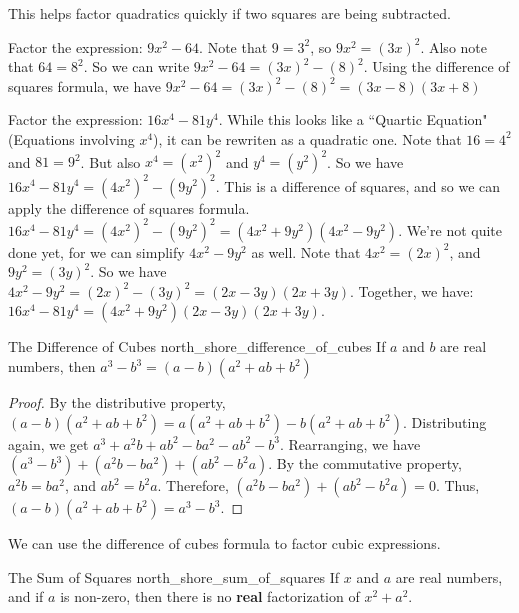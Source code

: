 \documentclass[crop=false,class=book,oneside]{standalone}
\begin{document}
        \begin{remark}
            This helps factor quadratics quickly if two
            squares are being subtracted.
        \end{remark}
        \begin{fexample}{}{}
            Factor the expression: $9x^{2}-64$.
            Note that $9=3^{2}$, so $9x^{2}=(3x)^{2}$.
            Also note that $64=8^{2}$. So we can write
            $9x^{2}-64=(3x)^{2}-(8)^{2}$.
            Using the difference of squares formula,
            we have $9x^{2}-64=(3x)^{2}-(8)^{2}=(3x-8)(3x+8)$
        \end{fexample}
        \begin{fexample}{}{}
        Factor the expression: $16x^{4}-81y^{4}$. While this looks like a ``Quartic Equation" (Equations involving $x^4$), it can be rewriten as a quadratic one. Note that $16=4^{2}$ and $81=9^{2}$. But also $x^{4}=(x^{2})^{2}$ and $y^{4}=(y^{2})^{2}$. So we have $16x^{4}-81y^{4}=(4x^{2})^{2}-(9y^{2})^{2}$. This is a difference of squares, and so we can apply the difference of squares formula. $16x^{4}-81y^{4}=(4x^{2})^{2}-(9y^{2})^{2}=(4x^{2}+9y^{2})(4x^{2}-9y^{2})$. We're not quite done yet, for we can simplify $4x^{2}-9y^{2}$ as well. Note that $4x^{2}=(2x)^{2}$, and $9y^{2}=(3y)^{2}$. So we have $4x^{2}-9y^{2}=(2x)^{2}-(3y)^{2}=(2x-3y)(2x+3y)$. Together, we have: $16x^{4}-81y^{4}=(4x^{2}+9y^{2})(2x-3y)(2x+3y)$.
        \end{fexample}
        \begin{ftheorem}{The Difference of Cubes}
                       {north_shore_difference_of_cubes}
            If $a$ and $b$ are real numbers,
            then $a^{3}-b^{3}=(a-b)(a^{2}+ab+b^{2})$
        \end{ftheorem}
        \begin{proof}
        By the distributive property, $(a-b)(a^{2}+ab+b^{2})=a(a^{2}+ab+b^{2})-b(a^{2}+ab+b^{2})$.
        Distributing again, we get $a^{3}+a^{2}b+ab^{2}-ba^{2}-ab^{2}-b^{3}$.
        Rearranging, we have $(a^{3}-b^{3})+(a^{2}b-ba^{2})+(ab^{2}-b^{2}a)$.
        By the commutative property, $a^{2}b=ba^{2}$, and $ab^{2}=b^{2}a$.
        Therefore, $(a^{2}b-ba^{2})+(ab^{2}-b^{2}a)=0$.
        Thus, $(a-b)(a^{2}+ab+b^{2})=a^{3}-b^{3}$.
        \end{proof}
        \begin{remark}
        We can use the difference of cubes formula to factor cubic expressions.
        \end{remark}
        \begin{ftheorem}{The Sum of Squares}
                       {north_shore_sum_of_squares}
            If $x$ and $a$ are real numbers, and if
            $a$ is non-zero, then there is no \textbf{real}
            factorization of $x^{2}+a^{2}$.
        \end{ftheorem}
\end{document}
